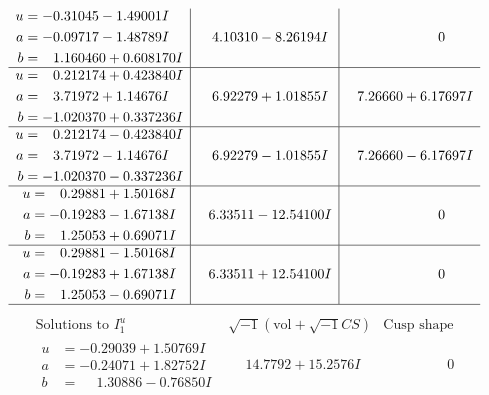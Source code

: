 \documentclass[1p]{elsarticle_modified}
\theoremstyle{definition}
\newcommand{\I}{\sqrt{-1}}
\begin{document}
$$\begin{array}{c|c|c}
\begin{aligned}
u &= -0.31045 - 1.49001 I \\
a &= -0.09717 - 1.48789 I \\
b &= \phantom{-}1.160460 + 0.608170 I\end{aligned}
 & \phantom{-}4.10310 - 8.26194 I & \phantom{-0.000000 } 0 \\ \hline\begin{aligned}
u &= \phantom{-}0.212174 + 0.423840 I \\
a &= \phantom{-}3.71972 + 1.14676 I \\
b &= -1.020370 + 0.337236 I\end{aligned}
 & \phantom{-}6.92279 + 1.01855 I & \phantom{-}7.26660 + 6.17697 I \\ \hline\begin{aligned}
u &= \phantom{-}0.212174 - 0.423840 I \\
a &= \phantom{-}3.71972 - 1.14676 I \\
b &= -1.020370 - 0.337236 I\end{aligned}
 & \phantom{-}6.92279 - 1.01855 I & \phantom{-}7.26660 - 6.17697 I \\ \hline\begin{aligned}
u &= \phantom{-}0.29881 + 1.50168 I \\
a &= -0.19283 - 1.67138 I \\
b &= \phantom{-}1.25053 + 0.69071 I\end{aligned}
 & \phantom{-}6.33511 - 12.54100 I & \phantom{-0.000000 } 0 \\ \hline\begin{aligned}
u &= \phantom{-}0.29881 - 1.50168 I \\
a &= -0.19283 + 1.67138 I \\
b &= \phantom{-}1.25053 - 0.69071 I\end{aligned}
 & \phantom{-}6.33511 + 12.54100 I & \phantom{-0.000000 } 0\\
 \hline 
 \end{array}$$\newpage$$\begin{array}{c|c|c}  
\text{Solutions to }I^u_{1}& \I (\text{vol} + \sqrt{-1}CS) & \text{Cusp shape}\\
 \hline 
\begin{aligned}
u &= -0.29039 + 1.50769 I \\
a &= -0.24071 + 1.82752 I \\
b &= \phantom{-}1.30886 - 0.76850 I\end{aligned}
 & \phantom{-}14.7792 + 15.2576 I & \phantom{-0.000000 } 0 \\ \hline\begin{aligned}

\end{aligned}
\end{array}$$
\end{document}
